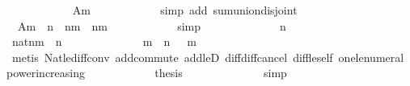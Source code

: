 \begin{isabellebody}
\ \ \ \ \ \ \ \ \ \ \isamarkupfalse%
\ Am\isanewline
\ \ \ \ \ \ \ \ \ \ \isamarkupfalse%
\ {\isacharparenleft}simp\ add{\isacharcolon}\ sum{\isachardot}union{\isacharunderscore}disjoint{\isacharparenright}\isanewline
\isanewline
\ \ \ \ \ \ \ \ \isamarkupfalse%
\isanewline
\isanewline
\ \ \ \ \ \ \ \ \isamarkupfalse%
\ {\isachardoublequoteopen}{\isacharparenleft}{\isasymSum}\ {\isacharquery}Am{\isacharparenright}\ {\isacharequal}\ {\isacharparenleft}{}{\isacharcircum}n\ {\isacharminus}\ {}{\isacharcircum}{\isacharparenleft}n{\isacharminus}m{\isacharplus}{}{\isacharparenright}{\isacharparenright}\ {\isacharplus}\ {}{\isacharcircum}{\isacharparenleft}n{\isacharminus}m{\isacharplus}{}{\isacharparenright}{\isachardoublequoteclose}\isanewline
\ \ \ \ \ \ \ \ \ \ \isamarkupfalse%
\ simp\isanewline
\ \ \ \ \ \ \ \ \isamarkupfalse%
\ \isamarkupfalse%
\ {\isachardoublequoteopen}{\isachardot}{\isachardot}{\isachardot}\ {\isacharequal}\ {}{\isacharcircum}n{\isachardoublequoteclose}\isanewline
\ \ \ \ \ \ \ \ \isamarkupfalse%
{\isacharminus}\isanewline
\ \ \ \ \ \ \ \ \ \ \isamarkupfalse%
\ {\isachardoublequoteopen}{\isacharparenleft}{}{\isacharcolon}{\isacharcolon}nat{\isacharparenright}{\isacharcircum}{\isacharparenleft}n{\isacharminus}m{\isacharplus}{}{\isacharparenright}\ {\isasymle}\ {}{\isacharcircum}n{\isachardoublequoteclose}\isanewline
\ \ \ \ \ \ \ \ \ \ \ \ \isamarkupfalse%
\ {\isacharbackquoteopen}m\ {\isasymle}\ n{\isacharbackquoteclose}\ {\isacharbackquoteopen}{}\ {\isasymle}\ m{\isacharbackquoteclose}\isanewline
\ \ \ \ \ \ \ \ \ \ \ \ \isamarkupfalse%
\ {\isacharparenleft}metis\ Nat{\isachardot}le{\isacharunderscore}diff{\isacharunderscore}conv{}\ add{\isachardot}commute\ add{\isacharunderscore}leD{}\ diff{\isacharunderscore}diff{\isacharunderscore}cancel\ diff{\isacharunderscore}le{\isacharunderscore}self\ one{\isacharunderscore}le{\isacharunderscore}numeral\ power{\isacharunderscore}increasing{\isacharparenright}\isanewline
\ \ \ \ \ \ \ \ \ \ \isamarkupfalse%
\ {\isacharquery}thesis\isanewline
\ \ \ \ \ \ \ \ \ \ \ \ \isamarkupfalse%
\ simp\isanewline
\ \ \ \ \ \ \ \ \isamarkupfalse%
\isanewline
\ \ \ \ \ \ \ \ \isamarkupfalse%
\ \isamarkupfalse%

\end{isabellebody}
